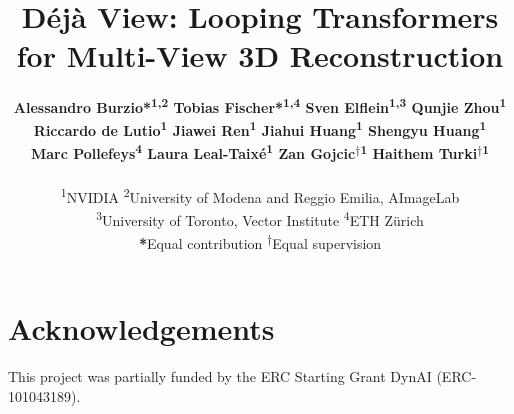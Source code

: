 \documentclass{article}
\begin{document}
\title{Déjà View: Looping Transformers for Multi-View 3D Reconstruction}

\author{
\textbf{Alessandro Burzio*\textsuperscript{1,2} \quad
Tobias Fischer*\textsuperscript{1,4} \quad
Sven Elflein\textsuperscript{1,3} \quad
Qunjie Zhou\textsuperscript{1}} \\
\textbf{Riccardo de Lutio\textsuperscript{1} \quad
Jiawei Ren\textsuperscript{1} \quad
Jiahui Huang\textsuperscript{1} \quad
Shengyu Huang\textsuperscript{1}} \\
\textbf{Marc Pollefeys\textsuperscript{4} \quad
Laura Leal-Taix\'e\textsuperscript{1} \quad
Zan Gojcic\textsuperscript{$\dagger$1} \quad
Haithem Turki\textsuperscript{$\dagger$1}} \\
\\
\textsuperscript{1}NVIDIA \quad
\textsuperscript{2}University of Modena and Reggio Emilia, AImageLab  \\
\textsuperscript{3}University of Toronto, Vector Institute \quad
\textsuperscript{4}ETH Z\"urich \\
\textbf{*}Equal contribution \quad
\textsuperscript{$\dagger$}Equal supervision
}

\maketitle








\section*{Acknowledgements}
This project was partially funded by the ERC Starting Grant DynAI (ERC-101043189).




\clearpage
\appendix

\end{document}
